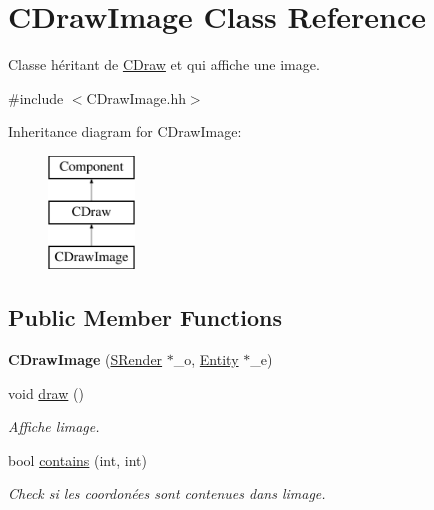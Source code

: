 \hypertarget{class_c_draw_image}{}\section{C\+Draw\+Image Class Reference}
\label{class_c_draw_image}


Classe héritant de \hyperlink{class_c_draw}{C\+Draw} et qui affiche une image.  




{\ttfamily \#include $<$C\+Draw\+Image.\+hh$>$}

Inheritance diagram for C\+Draw\+Image\+:\begin{figure}[H]
\begin{center}
\leavevmode
\includegraphics[height=3.000000cm]{class_c_draw_image}
\end{center}
\end{figure}
\subsection*{Public Member Functions}
\begin{DoxyCompactItemize}
\item 
\hypertarget{class_c_draw_image_a62863d288ca481e2d76c90a6b9a27b6a}{}{\bfseries C\+Draw\+Image} (\hyperlink{class_s_render}{S\+Render} $\ast$\+\_\+o, \hyperlink{class_entity}{Entity} $\ast$\+\_\+e)\label{class_c_draw_image_a62863d288ca481e2d76c90a6b9a27b6a}

\item 
\hypertarget{class_c_draw_image_a67e30b0863a13b06436318b3733a0e18}{}void \hyperlink{class_c_draw_image_a67e30b0863a13b06436318b3733a0e18}{draw} ()\label{class_c_draw_image_a67e30b0863a13b06436318b3733a0e18}

\begin{DoxyCompactList}\small\item\em Affiche l\textquotesingle{}image. \end{DoxyCompactList}\item 
bool \hyperlink{class_c_draw_image_a69e0ccf81bdf430ec0f3e77a0ce81e28}{contains} (int, int)
\begin{DoxyCompactList}\small\item\em Check si les coordonées sont contenues dans l\textquotesingle{}image. \end{DoxyCompactList}\end{DoxyCompactItemize}
